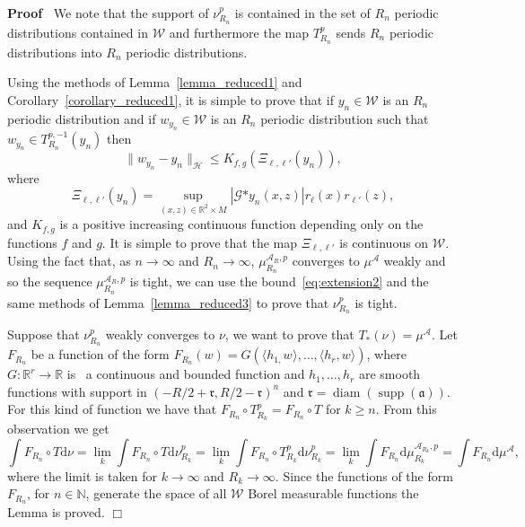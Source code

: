 \documentclass[a4paper,10pt]{article}
\newcommand{\asterisk}{\mathord{*}}
\newcommand{\mathd}{\mathrm{d}}
\newcommand{\tmop}[1]{\ensuremath{\operatorname{#1}}}
\newenvironment{proof}{\noindent\textbf{Proof\ }}{\hspace*{\fill}$\Box$\medskip}
\begin{document}
\begin{proof}
  We note that the support of $\nu_{R_n}^p$ is contained in the set of $R_n$
  periodic distributions contained in $\mathcal{W}$ and furthermore the map
  $T_{R_n}^p$ sends $R_n$ periodic distributions into $R_n$ periodic
  distributions.
  
  Using the methods of Lemma~\ref{lemma_reduced1} and
  Corollary~\ref{corollary_reduced1}, it is simple to prove that if $y_n \in
  \mathcal{W}$ is an $R_n$ periodic distribution and if $w_{y_n} \in
  \mathcal{W}$ is an $R_n$ periodic distribution such that $w_{y_n} \in T^{p,
  - 1}_{R_n} (y_n)$ then
  \begin{equation}
    \| w_{y_n} - y_n \|_{\mathcal{H}} \leqslant K_{f, g} (\Xi_{\ell, \ell'}
    (y_n)), \label{eq:extension2}
  \end{equation}
  where
  \[ \Xi_{\ell, \ell'} (y_n) = \sup_{(x, z) \in \mathbb{R}^2 \times M} |
     \mathcal{G} \asterisk y_n (x, z) | r_{\ell} (x) r_{\ell'} (z), \]
  and $K_{f, g}$ is a positive increasing continuous function depending only
  on the functions $f$ and $g$. It is simple to prove that the map $\Xi_{\ell,
  \ell'}$ is continuous on $\mathcal{W}$. Using the fact that, as $n
  \rightarrow \infty$ and $R_n \rightarrow \infty$, $\mu^{\mathcal{A}_R,
  p}_{R_n}$ converges to $\mu^{\mathcal{A}}$ weakly and so the sequence
  $\mu^{\mathcal{A}_R, p}_{R_n}$ is tight, we can use the
  bound~{\eqref{eq:extension2}} and the same methods of
  Lemma~\ref{lemma_reduced3} to prove that $\nu_{R_n}^p$ is tight.
  
  Suppose that $\nu_{R_n}^p$ weakly converges to $\nu$, we want to prove that
  $T_{\asterisk} (\nu) = \mu^{\mathcal{A}}$. Let $F_{R_n}$ be a function of
  the form $F_{R_n} (w) = G (\langle h_{1,} w_{} \rangle, \ldots, \langle h_r,
  w \rangle)$, where $G : \mathbb{R}^r \rightarrow \mathbb{R}$ is \ a
  continuous and bounded function and $h_1, \ldots, h_r$ are smooth functions
  with support in $(- R / 2 + \mathfrak{r}, R / 2 - \mathfrak{r})^n$ and
  $\mathfrak{r} = \tmop{diam} (\tmop{supp} (\mathfrak{a}))$. For this kind of
  function we have that $F_{R_n} \circ T_{R_k}^p = F_{R_n} \circ T$ for $k
  \geqslant n$. From this observation we get
  \[ \int F_{R_n} \circ T \mathd \nu = \lim_k \int F_{R_n} \circ T \mathd
     \nu_{R_k}^p = \lim_k \int F_{R_n} \circ T_{R_k}^p \mathd \nu_{R_k}^p =
     \lim_k \int F_{R_n} \mathd \mu^{\mathcal{A}_{R_k}, p}_{R_k} = \int
     F_{R_n} \mathd \mu^{\mathcal{A}}, \]
  where the limit is taken for $k \rightarrow \infty$ and $R_k \rightarrow
  \infty$. Since the functions of the form $F_{R_n}$, for $n \in \mathbb{N}$,
  generate the space of all $\mathcal{W}$ Borel measurable functions the Lemma
  is proved.
\end{proof}
\end{document}
